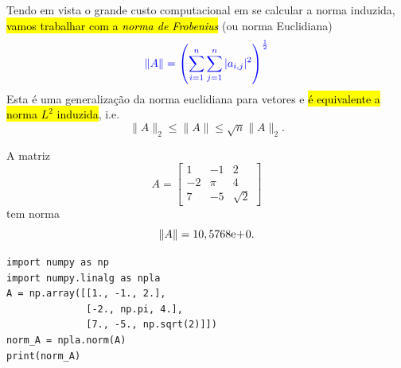 Tendo em vista o grande custo computacional em se calcular a norma induzida, \hl{vamos trabalhar com a \emph{norma de Frobenius}} (ou norma Euclidiana{\euclides})
\begin{equation}\color{blue}\|A\| = \left(\sum_{i=1}^n\sum_{j=1}^n|a_{i,j}|^2\right)^{\frac{1}{2}}
\end{equation}
Esta é uma generalização da norma euclidiana para vetores e \hl{é equivalente a norma $L^2$ induzida}, i.e.
\begin{equation}
  \|A\|_2 \leq \|A\| \leq \sqrt{n}\|A\|_2.
\end{equation}

\begin{ex}\label{ex:norma_matriz}
  A matriz
  \begin{equation}
    A =
    \begin{bmatrix}
      1 & -1 & 2\\
      -2 & \pi & 4\\
      7 & -5 & \sqrt{2}
    \end{bmatrix}
  \end{equation}
  tem norma
  \begin{equation}
    \|A\| = 10,5768\mathrm{e}\!+\!0.
  \end{equation}
\begin{lstlisting}
import numpy as np
import numpy.linalg as npla
A = np.array([[1., -1., 2.],
              [-2., np.pi, 4.],
              [7., -5., np.sqrt(2)]])
norm_A = npla.norm(A)
print(norm_A)
\end{lstlisting}
\end{ex}


